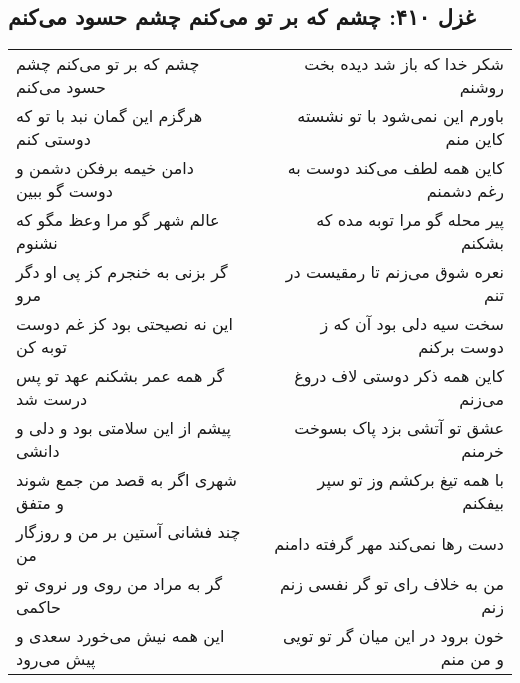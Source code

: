\begin{center}
\section*{غزل ۴۱۰: چشم که بر تو می‌کنم چشم حسود می‌کنم}
\label{sec:410}
\begin{longtable}{l p{0.5cm} r}
چشم که بر تو می‌کنم چشم حسود می‌کنم
&&
شکر خدا که باز شد دیده بخت روشنم
\\
هرگزم این گمان نبد با تو که دوستی کنم
&&
باورم این نمی‌شود با تو نشسته کاین منم
\\
دامن خیمه برفکن دشمن و دوست گو ببین
&&
کاین همه لطف می‌کند دوست به رغم دشمنم
\\
عالم شهر گو مرا وعظ مگو که نشنوم
&&
پیر محله گو مرا توبه مده که بشکنم
\\
گر بزنی به خنجرم کز پی او دگر مرو
&&
نعره شوق می‌زنم تا رمقیست در تنم
\\
این نه نصیحتی بود کز غم دوست توبه کن
&&
سخت سیه دلی بود آن که ز دوست برکنم
\\
گر همه عمر بشکنم عهد تو پس درست شد
&&
کاین همه ذکر دوستی لاف دروغ می‌زنم
\\
پیشم از این سلامتی بود و دلی و دانشی
&&
عشق تو آتشی بزد پاک بسوخت خرمنم
\\
شهری اگر به قصد من جمع شوند و متفق
&&
با همه تیغ برکشم وز تو سپر بیفکنم
\\
چند فشانی آستین بر من و روزگار من
&&
دست رها نمی‌کند مهر گرفته دامنم
\\
گر به مراد من روی ور نروی تو حاکمی
&&
من به خلاف رای تو گر نفسی زنم زنم
\\
این همه نیش می‌خورد سعدی و پیش می‌رود
&&
خون برود در این میان گر تو تویی و من منم
\\
\end{longtable}
\end{center}
